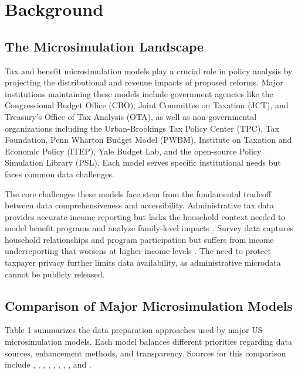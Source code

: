\section{Background}

\subsection{The Microsimulation Landscape}

Tax and benefit microsimulation models play a crucial role in policy analysis by projecting the distributional and revenue impacts of proposed reforms. Major institutions maintaining these models include government agencies like the Congressional Budget Office (CBO), Joint Committee on Taxation (JCT), and Treasury's Office of Tax Analysis (OTA), as well as non-governmental organizations including the Urban-Brookings Tax Policy Center (TPC), Tax Foundation, Penn Wharton Budget Model (PWBM), Institute on Taxation and Economic Policy (ITEP), Yale Budget Lab, and the open-source Policy Simulation Library (PSL). Each model serves specific institutional needs but faces common data challenges.

The core challenges these models face stem from the fundamental tradeoff between data comprehensiveness and accessibility. Administrative tax data provides accurate income reporting but lacks the household context needed to model benefit programs and analyze family-level impacts \citep{sabelhaus2020}. Survey data captures household relationships and program participation but suffers from income underreporting that worsens at higher income levels \citep{meyer2021}. The need to protect taxpayer privacy further limits data availability, as administrative microdata cannot be publicly released.

\subsection{Comparison of Major Microsimulation Models}

Table 1 summarizes the data preparation approaches used by major US microsimulation models. Each model balances different priorities regarding data sources, enhancement methods, and transparency. Sources for this comparison include \citep{cbo2018}, \citep{jct2023}, \citep{ota2012}, \citep{tpc2024}, \citep{tf2024}, \citep{pwbm2024}, \citep{policy2024}, \citep{budgetlab2024}, and \citep{psl2024}.

